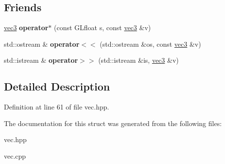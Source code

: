 \subsection*{\-Friends}
\begin{DoxyCompactItemize}
\item 
\hypertarget{struct_angel_1_1vec3_a1d78982e3d5969f2e9f98a536cfea9f7}{\hyperlink{struct_angel_1_1vec3}{vec3} {\bfseries operator$\ast$} (const \-G\-Lfloat s, const \hyperlink{struct_angel_1_1vec3}{vec3} \&v)}\label{struct_angel_1_1vec3_a1d78982e3d5969f2e9f98a536cfea9f7}

\item 
\hypertarget{struct_angel_1_1vec3_a3e8f4856b29a4320f185f9a9cf0f94bc}{std\-::ostream \& {\bfseries operator$<$$<$} (std\-::ostream \&os, const \hyperlink{struct_angel_1_1vec3}{vec3} \&v)}\label{struct_angel_1_1vec3_a3e8f4856b29a4320f185f9a9cf0f94bc}

\item 
\hypertarget{struct_angel_1_1vec3_ab705d3337286a4262e84bbbb0b694a56}{std\-::istream \& {\bfseries operator$>$$>$} (std\-::istream \&is, \hyperlink{struct_angel_1_1vec3}{vec3} \&v)}\label{struct_angel_1_1vec3_ab705d3337286a4262e84bbbb0b694a56}

\end{DoxyCompactItemize}


\subsection{\-Detailed \-Description}


\-Definition at line 61 of file vec.\-hpp.



\-The documentation for this struct was generated from the following files\-:\begin{DoxyCompactItemize}
\item 
vec.\-hpp\item 
vec.\-cpp\end{DoxyCompactItemize}
